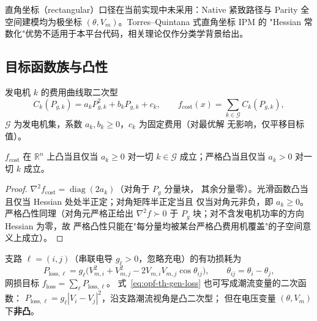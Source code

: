 \begin{gapnote}
直角坐标（rectangular）口径在当前实现中未采用：Native 紧致路径与 Parity
全空间建模均为极坐标 $(\theta,V_m)$。Torres--Quintana 式直角坐标 IPM 的
"Hessian 常数化"优势不适用于本平台代码，相关理论仅作分类学背景给出。
\end{gapnote}

\subsection{目标函数族与凸性}\label{sec:opf-th-gen-objectives}

\begin{definition}[二次发电费用]\label{def:opf-th-gen-quadcost}
发电机 $k$ 的费用曲线取二次型
\begin{equation}
C_k(P_{g,k})=a_kP_{g,k}^2+b_kP_{g,k}+c_k,\qquad
f_{\mathrm{cost}}(x)=\sum_{k\in\mathcal G}C_k(P_{g,k}),
\label{eq:opf-th-gen-quadcost}
\end{equation}
$\mathcal G$ 为发电机集，系数 $a_k,b_k\ge0$，$c_k$ 为固定费用（对最优解
无影响，仅平移目标值）。
\end{definition}

\begin{proposition}[二次费用的凸性判据]\label{prop:opf-th-gen-quadconvex}
$f_{\mathrm{cost}}$ 在 $\mathbb R^n$ 上凸当且仅当 $a_k\ge0$ 对一切
$k\in\mathcal G$ 成立；严格凸当且仅当 $a_k>0$ 对一切 $k$ 成立。
\end{proposition}

\begin{proof}
$\nabla^2 f_{\mathrm{cost}}=\operatorname{diag}(2a_k)$（对角于 $P_g$ 分量块，
其余分量零）。光滑函数凸当且仅当 Hessian 处处半正定；对角矩阵半正定当且
仅当对角元非负，即 $a_k\ge0$。严格凸性同理（对角元严格正给出
$\nabla^2f\succ0$ 于 $P_g$ 块；对不含发电机功率的方向 Hessian 为零，故
严格凸性只能在"每分量均被某台严格凸费用机覆盖"的子空间意义上成立）。
\end{proof}

\begin{remark}[网损最小目标]\label{rem:opf-th-gen-lossobj}
支路 $\ell=(i,j)$（串联电导 $g_\ell>0$，忽略充电）的有功损耗为
\begin{equation}
P_{\mathrm{loss},\ell}
=g_\ell\bigl(V_{m,i}^2+V_{m,j}^2-2V_{m,i}V_{m,j}\cos\theta_{ij}\bigr),
\qquad \theta_{ij}=\theta_i-\theta_j,
\label{eq:opf-th-gen-loss}
\end{equation}
网损目标 $f_{\mathrm{loss}}=\sum_\ell P_{\mathrm{loss},\ell}$。
式~\eqref{eq:opf-th-gen-loss} 也可写成潮流变量的二次函数：
$P_{\mathrm{loss},\ell}=g_\ell|V_i-V_j|^2$，沿支路潮流视角是凸二次型；
但在电压变量 $(\theta,V_m)$ 下\textbf{非凸}。
\end{remark}

